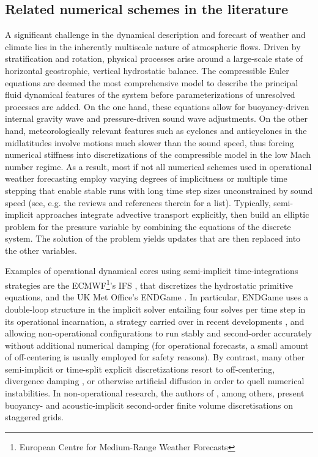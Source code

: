 \documentclass[12pt,a4paper]{article}
\theoremstyle{definition}
\begin{document}

\subsection{Related numerical schemes in the literature}

A significant challenge in the dynamical description and forecast of weather and climate lies in the inherently multiscale nature of atmospheric flows. Driven by stratification and rotation, physical processes arise around a large-scale state of horizontal geostrophic, vertical hydrostatic balance. The compressible Euler equations are deemed the most comprehensive model to describe the principal fluid dynamical features of the system before parameterizations of unresolved processes are added. On the one hand, these equations allow for buoyancy-driven internal gravity wave and pressure-driven sound wave adjustments.  On the other hand, meteorologically relevant features such as cyclones and anticyclones in the midlatitudes involve motions much slower than the sound speed, thus forcing numerical stiffness into discretizations of the compressible model in the low Mach number regime. As a result, most if not all numerical schemes used in operational weather forecasting employ varying degrees of implicitness or multiple time stepping that enable stable runs with long time step sizes unconstrained by sound speed (see, e.g. the reviews \cite{MarrasEtAl2016, MengaldoEtAl2018} and references therein for a list). Typically, semi-implicit approaches integrate advective transport explicitly, then build an elliptic problem for the pressure variable by combining the equations of the discrete system. The solution of the problem yields updates that are then replaced into the other variables. 

Examples of operational dynamical cores using semi-implicit time-integrations strategies are the ECMWF\footnote{European Centre for Medium-Range Weather Forecasts}'s IFS \cite{Hortal2002}, that discretizes the hydrostatic primitive equations, and the UK Met Office's ENDGame \cite{BenacchioWood2016, WoodEtAl2013}. In particular, ENDGame  uses a double-loop structure in the implicit solver entailing four solves per time step in its operational incarnation, a strategy carried over in recent developments \cite{MelvinEtAl2018}, and allowing non-operational configurations to run stably and second-order accurately without additional numerical damping (for operational forecasts, a small amount of off-centering is usually employed for safety reasons). By contrast, many other semi-implicit or time-split explicit discretizations resort to off-centering, divergence damping \cite{BryanFritsch2002}, or otherwise artificial diffusion in order to quell numerical instabilities. In non-operational research, the authors of \cite{DumbserEtAl2018}, among others, present buoyancy- and acoustic-implicit second-order finite volume discretisations on staggered grids.
\end{document}
